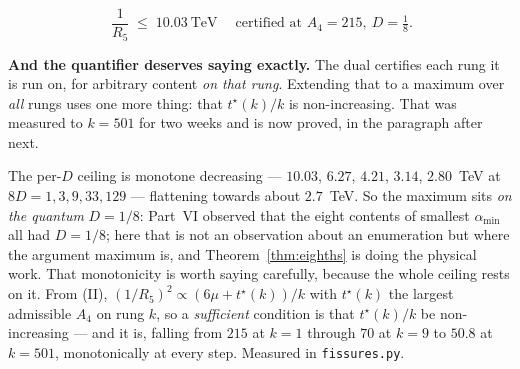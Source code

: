 \documentclass[11pt,a4paper]{article}
\newcommand{\amin}{\alpha_{\min}}
\newenvironment{keyeq}
  {\begin{center}\setlength{\fboxsep}{9pt}\setlength{\fboxrule}{0.8pt}%
   \begin{lrbox}{\keyeqbox}\begin{minipage}{0.88\textwidth}}
  {\end{minipage}\end{lrbox}%
   \fcolorbox{hdrblue!55}{hdrblue!6}{\usebox{\keyeqbox}}\end{center}}
\begin{document}
\begin{keyeq}
\begin{equation}\label{eq:ceiling}
  \boxed{\;\frac{1}{R_5}\;\le\;10.03\ \text{TeV}\;}
  \quad\text{certified at } A_4=215,\ D=\tfrac18 .
\end{equation}
\end{keyeq}

\noindent \textbf{And the quantifier deserves saying exactly.} The dual certifies each rung it is
run on, for arbitrary content \emph{on that rung}. Extending that to a maximum over \emph{all}
rungs uses one more thing: that $t^\star(k)/k$ is non-increasing. That was measured to $k=501$ for
two weeks and is now proved, in the paragraph after next.

\noindent The per-$D$ ceiling is monotone decreasing --- $10.03$, $6.27$, $4.21$, $3.14$, $2.80$~TeV
at $8D=1,3,9,33,129$ --- flattening towards about $2.7$~TeV. So the maximum sits \emph{on the
quantum} $D=1/8$: Part~VI observed that the eight contents of smallest $\amin$ all had $D=1/8$; here
that is not an observation about an enumeration but where the argument maximum is, and
Theorem~\ref{thm:eighths} is doing the physical work. That monotonicity is worth saying carefully,
because the whole ceiling rests on it. From (II), $(1/R_5)^2\propto(6\mu+t^\star(k))/k$ with
$t^\star(k)$ the largest admissible $A_4$ on rung $k$, so a \emph{sufficient} condition is that
$t^\star(k)/k$ be non-increasing --- and it is, falling from $215$ at $k=1$ through $70$ at $k=9$ to
$50.8$ at $k=501$, monotonically at every step. Measured in \texttt{fissures.py}.
\end{document}
